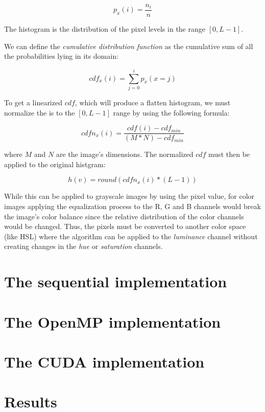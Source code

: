 \documentclass[10pt,twocolumn,letterpaper]{article}
\begin{document}
\[ p_x(i) = \frac{n_i}{n} \]

The histogram is the distribution of the pixel levels in the range \([0, L - 1]\).

We can define the \emph{cumulative distribution function} as the cumulative sum
of all the probabilities lying in its domain:

\[ cdf_x(i) = \sum_{j=0}^{i} p_x(x = j) \]

To get a linearized \(cdf\), which will produce a flatten histogram, we must
normalize the is to the \([0, L - 1]\) range by using the following formula:

\[ cdfn_x(i) = \frac{cdf(i) - cdf_{min}}{(M * N) - cdf_{min}} \]

where \(M\) and \(N\) are the image's dimensions. The normalized \(cdf\) must
then be applied to the original histgram:

\[ h(v) = round(cdfn_x(i) * (L - 1)) \]

While this can be applied to grayscale images by using the pixel value, for
color images applying the equalization process to the R, G and B channels would
break the image's color balance since the relative distribution of the color
channels would be changed. Thus, the pixels must be converted to another color
space (like HSL) where the algorithm can be applied to the \emph{luminance}
channel without creating changes in the \emph{hue} or \emph{saturation}
channels.

\section{The sequential implementation}


\section{The OpenMP implementation}


\section{The CUDA implementation}


\section{Results}


{\small


}
\end{document}

